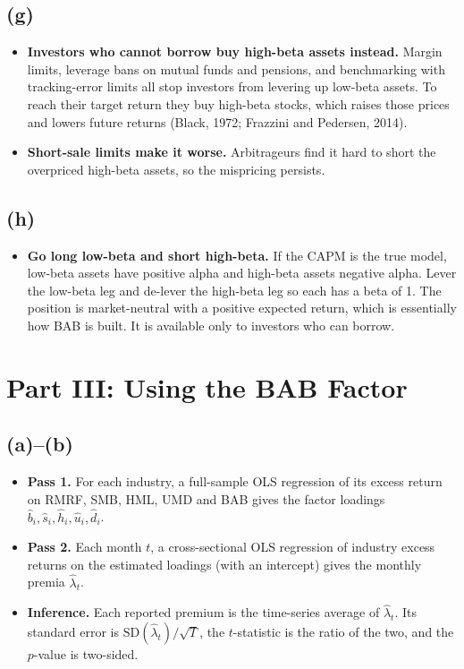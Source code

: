 \subsection*{(g)}
\begin{itemize}
  \item \textbf{Investors who cannot borrow buy high-beta assets instead.} Margin limits, leverage bans on mutual funds and pensions, and benchmarking with tracking-error limits all stop investors from levering up low-beta assets. To reach their target return they buy high-beta stocks, which raises those prices and lowers future returns (Black, 1972; Frazzini and Pedersen, 2014).
  \item \textbf{Short-sale limits make it worse.} Arbitrageurs find it hard to short the overpriced high-beta assets, so the mispricing persists.
\end{itemize}

\subsection*{(h)}
\begin{itemize}
  \item \textbf{Go long low-beta and short high-beta.} If the CAPM is the true model, low-beta assets have positive alpha and high-beta assets negative alpha. Lever the low-beta leg and de-lever the high-beta leg so each has a beta of 1. The position is market-neutral with a positive expected return, which is essentially how BAB is built. It is available only to investors who can borrow.
\end{itemize}


\section{Part III: Using the BAB Factor}

\subsection*{(a)--(b)}
\begin{itemize}
  \item \textbf{Pass 1.} For each industry, a full-sample OLS regression of its excess return on RMRF, SMB, HML, UMD and BAB gives the factor loadings $\hat b_i, \hat s_i, \hat h_i, \hat u_i, \hat d_i$.
  \item \textbf{Pass 2.} Each month $t$, a cross-sectional OLS regression of industry excess returns on the estimated loadings (with an intercept) gives the monthly premia $\hat\lambda_t$.
  \item \textbf{Inference.} Each reported premium is the time-series average of $\hat\lambda_t$. Its standard error is $\mathrm{SD}(\hat\lambda_t)/\sqrt{T}$, the $t$-statistic is the ratio of the two, and the $p$-value is two-sided.
\end{itemize}

